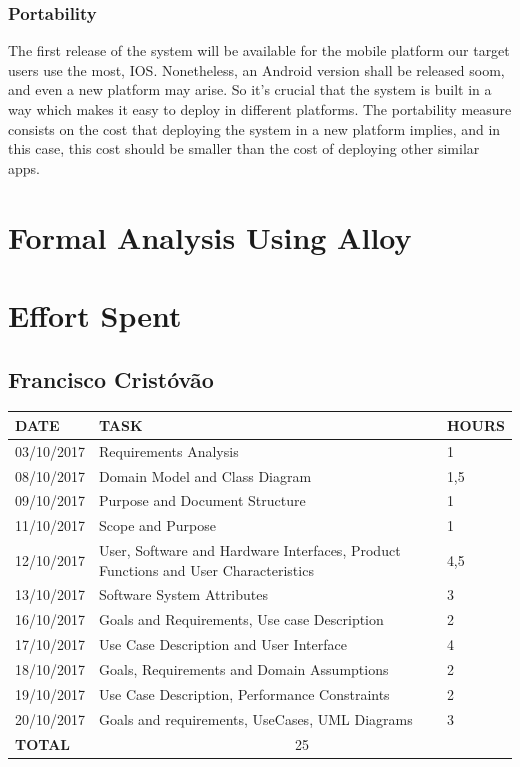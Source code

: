 \documentclass[12pt]{article}
\begin{document}
\subsubsection{Portability}
The first release of the system will be available for the mobile platform our target users use the most, IOS. Nonetheless, an Android version shall be released soom, and even a new platform may arise. So it's crucial that the system is built in a way which makes it easy to deploy in different platforms. The portability measure consists on the cost that deploying the system in a new platform implies, and in this case, this cost should be smaller than the cost of deploying other similar apps.

\section{Formal Analysis Using Alloy}

\section{Effort Spent}
\subsection{Francisco Cristóvão}

\begin{center}
\begin{tabular}{ |p{}|p{}|p{}| } 
 \hline
 \textbf{DATE} & \textbf{TASK} & \textbf{HOURS} \\ 
  \hline
 03/10/2017 & Requirements Analysis & 1 \\ 
  \hline
 08/10/2017 & Domain Model and Class Diagram & 1,5 \\ 
  \hline
  09/10/2017 & Purpose and Document Structure & 1 \\ 
  \hline
  11/10/2017 & Scope and Purpose & 1 \\ 
  \hline
  12/10/2017 & User, Software and Hardware Interfaces, Product Functions and User Characteristics & 4,5 \\ 
  \hline
  13/10/2017 & Software System Attributes & 3 \\ 
  \hline
  16/10/2017 & Goals and Requirements, Use case Description & 2 \\ 
  \hline
  17/10/2017 & Use Case Description and User Interface & 4 \\ 
  \hline
  18/10/2017 & Goals, Requirements and Domain Assumptions & 2 \\ 
  \hline
  19/10/2017 & Use Case Description, Performance Constraints & 2 \\ 
  \hline
  20/10/2017 & Goals and requirements, UseCases, UML Diagrams & 3 \\ 
  \hline
  \textbf{TOTAL} & \multicolumn{2}{c|}{25} \\ 
  \hline
\end{tabular}
\end{center}
\end{document}
